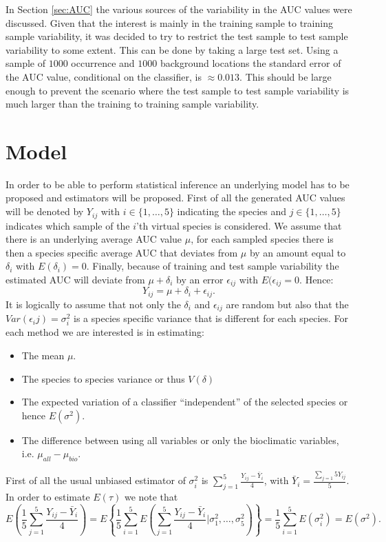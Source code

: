 In Section \ref{sec:AUC} the various sources of the variability in the AUC values were discussed. Given that the interest is mainly in the training sample to training sample variability, it was decided to try to restrict the test sample to test sample variability to some extent. This can be done by taking a large test set. Using a sample of $1000$ occurrence and $1000$ background locations the standard error of the AUC value, conditional on the classifier, is $\approx 0.013$. This should be large enough to prevent the scenario where the test sample to test sample variability is much larger than the training to training sample variability.

\section{Model}

In order to be able to perform statistical inference an underlying model has to be proposed and estimators will be proposed. First of all the generated AUC values will be denoted by $Y_{ij}$ with $i \in \{1,\ldots,5\}$ indicating the species and $j \in \{1,\ldots,5\}$ indicates which sample of the $i$'th virtual species is considered. We assume that there is an underlying average AUC value $\mu$, for each sampled species there is then a species specific average AUC that deviates from $\mu$ by an amount equal to $\delta_i$ with $E(\delta_i) = 0$. Finally, because of training and test sample variability the estimated AUC will deviate from $\mu + \delta_i$ by an error $\epsilon_{ij}$ with $E(\epsilon_{ij} = 0$. Hence:
\[Y_{ij} = \mu + \delta_i + \epsilon_{ij}.\]
It is logically to assume that not only the $\delta_i$ and $\epsilon_{ij}$ are random but also that the $Var(\epsilon_ij) = \sigma_i^2$ is a species specific variance that is different for each species. For each method we are interested is in estimating:
\begin{itemize}
\item The mean $\mu$.
\item The species to species variance or thus $V(\delta)$
\item The expected variation of a classifier ``independent'' of the selected species or hence $E(\sigma^2)$.
\item The difference between using all variables or only the bioclimatic variables, i.e. $\mu_{all} - \mu_{bio}$.
\end{itemize} 

First of all the usual unbiased estimator of $\sigma_i^2$ is $\sum_{j= 1}^{5} \frac{Y_{ij} - \bar{Y}_i}{4} $, with $\bar{Y}_i = \frac{\sum_{j=1}{5}Y_{ij}}{5}$.
In order to estimate $E(\tau)$ we note that 
\[E\left(\frac{1}{5} \sum_{j= 1}^{5} \frac{Y_{ij} - \bar{Y}_i}{4}\right) = E\left\lbrace \frac{1}{5} \sum_{i=1}^5 E\left( \sum_{j= 1}^{5} \frac{Y_{ij} - \bar{Y}_i}{4}  \bigg\vert \sigma_1^2, \ldots, \sigma_5^2 \right) \right\rbrace = \frac{1}{5} \sum_{i=1}^5 E \left( \sigma_i ^ 2 \right) = E\left( \sigma^2 \right). \]

